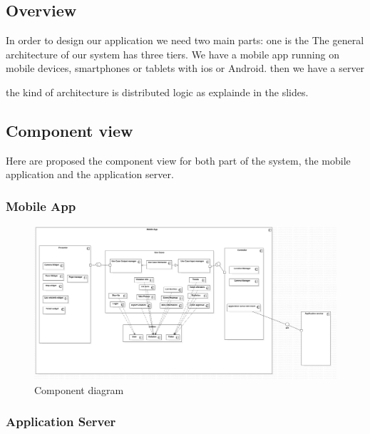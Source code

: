 \subsection{Overview}
In order to design our application we need two main parts: one is the
The general architecture of our system has three tiers.
We have a mobile app running on mobile devices, smartphones or tablets with ios or Android.
then we have a server

the kind of architecture is distributed logic as explainde in the slides.


\subsection{Component view}

Here are proposed the component view for both part of the system, the mobile application and the application server.


\subsubsection{Mobile App}

\begin{figure}
\centering
\includegraphics[width=\textwidth]{Images/ComponentDiagram1.png}
\caption{\label{fig:compdiag} Component diagram}
\end{figure}



\subsubsection{Application Server}

